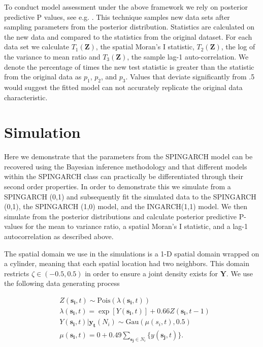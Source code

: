 \documentclass[11pt]{isuthesis}
\begin{document}
To conduct model assessment under the above framework we rely on posterior predictive P values, see e.g. \cite{gelman1996posterior}.  This technique samples new data sets after sampling parameters from the posterior distribution.  Statistics are calculated on the new data and compared to the statistics from the original dataset.  For each data set we calculate $T_1(\boldsymbol{Z})$, the spatial Moran's I statistic, $T_2(\boldsymbol{Z})$, the log of the variance to mean ratio and $T_3(\boldsymbol{Z})$, the sample lag-1 auto-correlation.  We denote the percentage of times the new test statistic is greater than the statistic from the original data as $p_1$, $p_2$, and $p_3$.  Values that deviate significantly from .5 would suggest the fitted model can not accurately replicate the original data characteristic.

\section{Simulation}\label{Sec:Sim}

Here we demonstrate that the parameters from the SPINGARCH model can be recovered using the Bayesian inference methodology and that different models within the SPINGARCH class can practically be differentiated through their second order properties.  In order to demonstrate this we simulate from a SPINGARCH (0,1) and subsequently fit the simulated data to the SPINGARCH (0,1), the SPINGARCH (1,0) model, and the INGARCH(1,1) model.  We then simulate from the posterior distributions and calculate posterior predictive P-values for the mean to variance ratio, a spatial Moran's I statistic, and a lag-1 autocorrelation as described above.

The spatial domain we use in the simulations is a 1-D spatial domain wrapped on a cylinder, meaning that each spatial location had two neighbors.  This domain restricts $\zeta \in (-0.5,0.5)$ in order to ensure a joint density exists for $\boldsymbol{Y}$.  We use the following data generating process

\begin{align}
	& Z(\boldsymbol{s_i},t)  \sim\mbox{Pois}(\lambda(\boldsymbol{s_i},t))\label{eq:SEPoissonGen}\\
	& \lambda(\boldsymbol{s_i},t) =\exp \left[ Y(\boldsymbol{s_i},t) \right] + 0.66 Z(\boldsymbol{s_i},t-1)\nonumber\\
	& Y(\boldsymbol{s_i},t)|\boldsymbol{y_t}(N_i)  \sim \mbox{Gau}(\mu(s_i,t),0.5)\nonumber\\ 
	& \mu(\boldsymbol{s_i},t)  = 0+ 0.49 \sum_{\boldsymbol{s_j} \in N_i} \{y(\boldsymbol{s_j},t)\}\nonumber.
\end{align}
\end{document}
